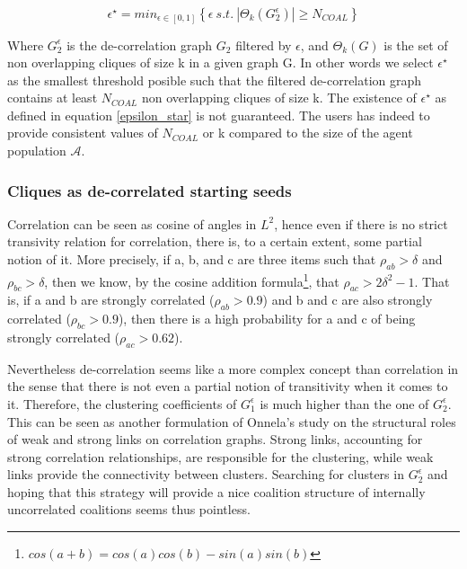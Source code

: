 \documentclass[conference]{IEEEtran}
\begin{document}
\begin{equation}
\label{epsilon_star}
\epsilon^{\star} = min_{ \epsilon \in [0,1]} \left\{ \epsilon\ s.t.\ |\Theta_{k}(G_{2}^{\epsilon})| \geq N_{COAL} \right\}
\end{equation} 

Where $ G_{2}^{\epsilon} $ is the de-correlation graph $ G_{2} $ filtered by $ \epsilon $, and $ \Theta_{k}(G) $ is the set of non overlapping cliques of size k in a given graph G. In other words we select $ \epsilon^{\star} $ as the smallest threshold posible such that the filtered de-correlation graph contains at least $ N_{COAL} $ non overlapping cliques of size k. The existence of $ \epsilon^{\star} $  as defined in equation  \ref{epsilon_star} is not guaranteed. The users has indeed to provide consistent values of $ N_{COAL} $ or k compared to the size of the agent population $ \mathcal{A} $. \\

\subsubsection{Cliques as de-correlated starting seeds}

Correlation can be seen as cosine of angles in $ L^{2} $, hence even if there is no strict transivity relation for correlation, there is, to a certain extent, some partial notion of it. More precisely, if a, b, and c are three items such that $ \rho_{ab} > \delta $ and $ \rho_{bc} > \delta $, then we know, by the cosine addition formula\footnote{ $ cos(a+b) = cos(a)cos(b) - sin(a)sin(b) $ }, that $ \rho_{ac} > 2 \delta^{2} - 1 $. That is, if a and b are strongly correlated ($\rho_{ab} > 0.9 $) and b and c are also strongly correlated ($\rho_{bc} > 0.9 $), then there is a high probability for a and c of being strongly correlated ($\rho_{ac} > 0.62 $).

Nevertheless de-correlation seems like a more complex concept than correlation in the sense that there is not even a partial notion of transitivity when it comes to it. Therefore, the clustering coefficients of $ G_{1}^{\epsilon} $ is much higher than the one of $ G_{2}^{\epsilon} $. This can be seen as another formulation of Onnela's study on the structural roles of weak and strong links on correlation graphs. Strong links, accounting for strong correlation relationships, are responsible for the clustering, while weak links provide the connectivity between clusters. Searching for clusters in $ G_{2}^{\epsilon} $ and hoping that this strategy will provide a nice coalition structure of internally uncorrelated coalitions seems thus pointless.
\end{document}

